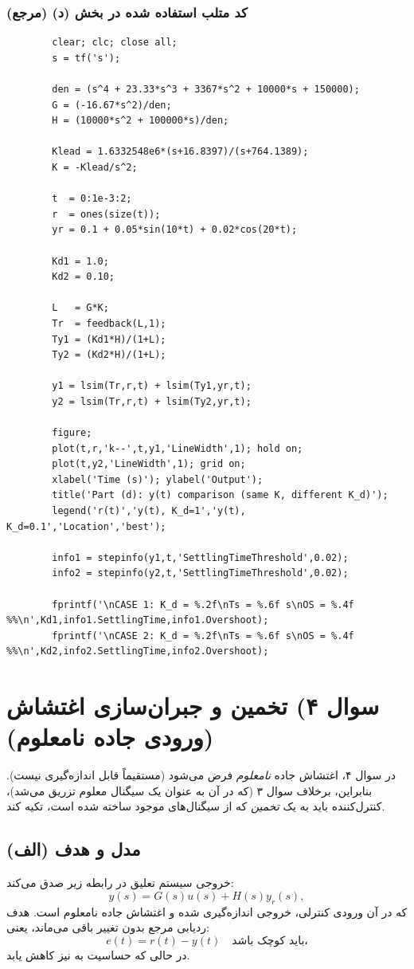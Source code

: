 \documentclass[a4paper]{article}
\begin{document}
\subsubsection*{کد متلب استفاده شده در بخش (د) (مرجع)}
\begin{latin}
	\begin{verbatim}
		clear; clc; close all;
		s = tf('s');
		
		den = (s^4 + 23.33*s^3 + 3367*s^2 + 10000*s + 150000);
		G = (-16.67*s^2)/den;
		H = (10000*s^2 + 100000*s)/den;
		
		Klead = 1.6332548e6*(s+16.8397)/(s+764.1389);
		K = -Klead/s^2;
		
		t  = 0:1e-3:2;
		r  = ones(size(t));
		yr = 0.1 + 0.05*sin(10*t) + 0.02*cos(20*t);
		
		Kd1 = 1.0;
		Kd2 = 0.10;
		
		L   = G*K;
		Tr  = feedback(L,1);
		Ty1 = (Kd1*H)/(1+L);
		Ty2 = (Kd2*H)/(1+L);
		
		y1 = lsim(Tr,r,t) + lsim(Ty1,yr,t);
		y2 = lsim(Tr,r,t) + lsim(Ty2,yr,t);
		
		figure;
		plot(t,r,'k--',t,y1,'LineWidth',1); hold on;
		plot(t,y2,'LineWidth',1); grid on;
		xlabel('Time (s)'); ylabel('Output');
		title('Part (d): y(t) comparison (same K, different K_d)');
		legend('r(t)','y(t), K_d=1','y(t), K_d=0.1','Location','best');
		
		info1 = stepinfo(y1,t,'SettlingTimeThreshold',0.02);
		info2 = stepinfo(y2,t,'SettlingTimeThreshold',0.02);
		
		fprintf('\nCASE 1: K_d = %.2f\nTs = %.6f s\nOS = %.4f %%\n',Kd1,info1.SettlingTime,info1.Overshoot);
		fprintf('\nCASE 2: K_d = %.2f\nTs = %.6f s\nOS = %.4f %%\n',Kd2,info2.SettlingTime,info2.Overshoot);
	\end{verbatim}
\end{latin}
\newpage

\section{سوال ۴) تخمین و جبران‌سازی اغتشاش (ورودی جاده نامعلوم)}

در سوال ۴، اغتشاش جاده  \emph{نامعلوم} فرض می‌شود (مستقیماً قابل اندازه‌گیری نیست).
بنابراین، برخلاف سوال ۳ (که در آن  به عنوان یک سیگنال معلوم تزریق می‌شد)، کنترل‌کننده باید به یک \emph{تخمین}  که از سیگنال‌های موجود ساخته شده است، تکیه کند.

\subsection{(الف) مدل و هدف}
خروجی سیستم تعلیق در رابطه زیر صدق می‌کند:
\begin{equation}
	y(s)=G(s)u(s)+H(s)y_r(s),
\end{equation}
که در آن  ورودی کنترلی،  خروجی اندازه‌گیری شده و  اغتشاش جاده نامعلوم است.
هدف ردیابی مرجع بدون تغییر باقی می‌ماند، یعنی:
\begin{equation}
	e(t)=r(t)-y(t)\quad \text{باید کوچک باشد،}
\end{equation}
در حالی که حساسیت  به  نیز کاهش یابد.
\end{document}

